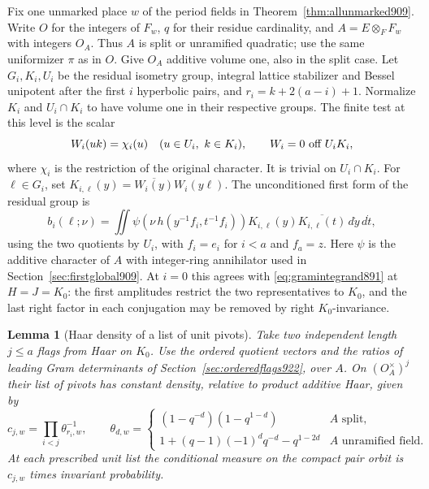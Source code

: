 \documentclass[a4paper,11pt]{article}
\newtheorem{lemma}[proposition]{Lemma}
\theoremstyle{definition}
\theoremstyle{remark}
\numberwithin{equation}{section}
\begin{document}
Fix one unmarked place \(w\) of the period fields in
Theorem~\ref{thm:allunmarked909}. Write \(O\) for the integers of
\(F_w\), \(q\) for their residue cardinality, and \(A=E\otimes_F F_w\)
with integers \(O_A\). Thus \(A\) is split or unramified quadratic;
use the same uniformizer \(\pi\) as in \(O\). Give \(O_A\) additive
volume one, also in the split case. Let \(G_i,K_i,U_i\) be the
residual isometry group, integral lattice stabilizer and Bessel
unipotent after the first \(i\) hyperbolic pairs, and
\(r_i=k+2(a-i)+1\). Normalize \(K_i\) and \(U_i\cap K_i\) to
have volume one in their respective groups. The finite test
at this level is the scalar
\[
    W_i(uk)=\chi_i(u)\quad (u\in U_i,\ k\in K_i),\qquad
                    W_i=0\ \hbox{off }U_iK_i ,
\]
where \(\chi_i\) is the restriction of the original character.
It is trivial on \(U_i\cap K_i\). For \(\ell\in G_i\), set
\(K_{i,\ell}(y)=\overline{W_i(y)}W_i(y\ell)\). The unconditioned
first form of the residual group is
\[
 b_i(\ell;\nu)=\iint \psi\!\left(\nu\,h(y^{-1}f_i,t^{-1}f_i)\right)
          K_{i,\ell}(y)\overline{K_{i,\ell}(t)}\,d\dot y\,d\dot t ,
\]
using the two quotients by \(U_i\), with \(f_i=e_i\) for \(i<a\)
and \(f_a=z\). Here \(\psi\) is the additive character of \(A\)
with integer-ring annihilator used in Section~\ref{sec:firstglobal909}.
At \(i=0\) this agrees with \eqref{eq:gramintegrand891} at
\(H=J=K_0\): the first amplitudes restrict the two representatives
to \(K_0\), and the last right factor in each conjugation may
be removed by right \(K_0\)-invariance.

\begin{lemma}[Haar density of a list of unit pivots]
\leavevmode\label{lem:finiteunitdensity930}
Take two independent length \(j\le a\) flags from Haar on \(K_0\).
Use the ordered quotient vectors and the ratios of leading
Gram determinants of Section~\ref{sec:orderedflags922}, over
\(A\). On \((O_A^\times)^j\) their list of pivots has constant
density, relative to product additive Haar, given by
\[
 c_{j,w}=\prod_{i<j}\theta_{r_i,w}^{-1},\qquad
 \theta_{d,w}=
 \begin{cases}
 (1-q^{-d})(1-q^{1-d})&A\text{ split},\\
 1+(q-1)(-1)^d q^{-d}-q^{1-2d}&A\text{ unramified field}.
 \end{cases}
\]
At each prescribed unit list the conditional measure on the
compact pair orbit is \(c_{j,w}\) times invariant probability.
\end{lemma}
\end{document}
